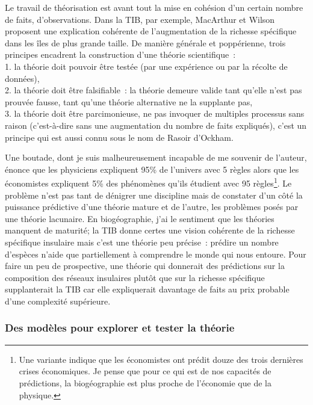 Le travail de théorisation est avant tout la mise en cohésion d'un
certain nombre de faits, d'observations. Dans la TIB, par exemple,
MacArthur et Wilson proposent une explication cohérente de
l'augmentation de la richesse spécifique dans les îles de plus grande
taille. De manière générale et poppérienne, trois principes encadrent la
construction d'une théorie scientifique~:\\
1. la théorie doit pouvoir être testée (par une expérience ou par la
récolte de données),\\
2. la théorie doit être falsifiable~: la théorie demeure valide tant
qu'elle n'est pas prouvée fausse, tant qu'une théorie alternative ne la
supplante pas,\\
3. la théorie doit être parcimonieuse, ne pas invoquer de multiples
processus sans raison (c'est-à-dire sans une augmentation du nombre de
faits expliqués), c'est un principe qui est aussi connu sous le nom de
Rasoir d'Ockham.

Une boutade, dont je suis malheureusement incapable de me souvenir de
l'auteur, énonce que les physiciens expliquent 95\% de l'univers avec 5
règles alors que les économistes expliquent 5\% des phénomènes qu'ils
étudient avec 95 règles\footnote{Une variante indique que les
  économistes ont prédit douze des trois dernières crises économiques.
  Je pense que pour ce qui est de nos capacités de prédictions, la
  biogéographie est plus proche de l'économie que de la physique.}. Le
problème n'est pas tant de dénigrer une discipline mais de constater
d'un côté la puissance prédictive d'une théorie mature et de l'autre,
les problèmes posés par une théorie lacunaire. En biogéographie, j'ai le
sentiment que les théories manquent de maturité; la TIB donne certes une
vision cohérente de la richesse spécifique insulaire mais c'est une
théorie peu précise~: prédire un nombre d'espèces n'aide que
partiellement à comprendre le monde qui nous entoure. Pour faire un peu
de prospective, une théorie qui donnerait des prédictions sur la
composition des réseaux insulaires plutôt que sur la richesse spécifique
supplanterait la TIB car elle expliquerait davantage de faits au prix
probable d'une complexité supérieure.

\subsubsection*{Des modèles pour explorer et tester la
théorie}\label{des-moduxe8les-pour-explorer-et-tester-la-thuxe9orie}

